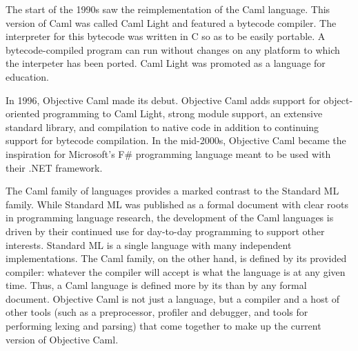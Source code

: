 The start of the 1990s saw the reimplementation of the Caml language. This version of Caml was called Caml Light and featured a bytecode compiler. The interpreter for this bytecode was written in C so as to be easily portable. A bytecode-compiled program can run without changes on any platform to which the interpeter has been ported. Caml Light was promoted as a language for education.

In 1996, Objective Caml made its debut. Objective Caml adds support for object-oriented programming to Caml Light, strong module support, an extensive standard library, and compilation to native code in addition to continuing support for bytecode compilation. In the mid-2000s, Objective Caml became the inspiration for Microsoft's F\# programming language meant to be used with their .NET framework.

The Caml family of languages provides a marked contrast to the Standard ML family. While Standard ML was published as a formal document with clear roots in programming language research, the development of the Caml languages is driven by their continued use for day-to-day programming to support other interests. Standard ML is a single language with many independent implementations. The Caml family, on the other hand, is defined by its provided compiler: whatever the compiler will accept is what the language is at any given time. Thus, a Caml language is defined more by its  than by any formal document. Objective Caml is not just a language, but a compiler and a host of other tools (such as a preprocessor, profiler and debugger, and tools for performing lexing and parsing) that come together to make up the current version of Objective Caml.